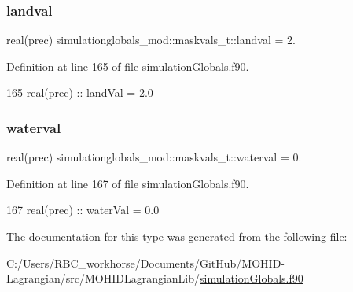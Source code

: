 \subsubsection{\texorpdfstring{landval}{landval}}
{\footnotesize\ttfamily real(prec) simulationglobals\+\_\+mod\+::maskvals\+\_\+t\+::landval = 2.\hspace{0.3cm}{\ttfamily [private]}}



Definition at line 165 of file simulation\+Globals.\+f90.


\begin{DoxyCode}
165         \textcolor{keywordtype}{real(prec)} :: landVal  = 2.0
\end{DoxyCode}
\mbox{\label{structsimulationglobals__mod_1_1maskvals__t_ad37aae6fd7454ee653511020ad79f539}} 
\subsubsection{\texorpdfstring{waterval}{waterval}}
{\footnotesize\ttfamily real(prec) simulationglobals\+\_\+mod\+::maskvals\+\_\+t\+::waterval = 0.\hspace{0.3cm}{\ttfamily [private]}}



Definition at line 167 of file simulation\+Globals.\+f90.


\begin{DoxyCode}
167         \textcolor{keywordtype}{real(prec)} :: waterVal = 0.0
\end{DoxyCode}


The documentation for this type was generated from the following file\+:\begin{DoxyCompactItemize}
\item 
C\+:/\+Users/\+R\+B\+C\+\_\+workhorse/\+Documents/\+Git\+Hub/\+M\+O\+H\+I\+D-\/\+Lagrangian/src/\+M\+O\+H\+I\+D\+Lagrangian\+Lib/\mbox{\hyperlink{simulation_globals_8f90}{simulation\+Globals.\+f90}}\end{DoxyCompactItemize}
